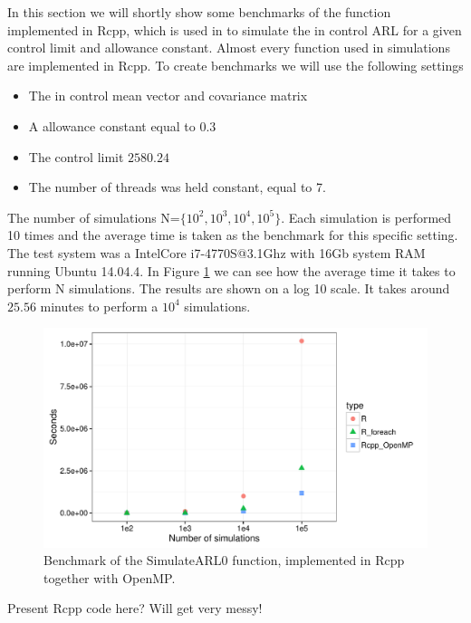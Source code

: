 \documentclass[a4paper,11pt,fleqn,twoside,notitlepage]{report}\usepackage[]{graphicx}\usepackage[]{color}
\makeatletter
\def\maxwidth{ %
  \ifdim\Gin@nat@width>\linewidth
    \linewidth
  \else
    \Gin@nat@width
  \fi
}
\newenvironment{knitrout}{}{} %
\makeatother
\begin{document}
In this section we will shortly show some benchmarks of the  function implemented in Rcpp, which is used in to simulate the in control ARL for a given control limit and allowance constant. Almost every function used in simulations are implemented in Rcpp. To create benchmarks we will use the following settings 
\begin{itemize}
\item The in control mean vector and covariance matrix
\item A allowance constant equal to $0.3$
\item The control limit $2580.24$
\item The number of threads was held constant, equal to 7. 
\end{itemize}
The number of simulations N=$\{10^2,10^3,10^4,10^5\}$. Each simulation is performed 10 times and the average time is taken as the benchmark for this specific setting. The test system was a Intel\textregistered Core i7-4770S@3.1Ghz with 16Gb system RAM running Ubuntu 14.04.4. In Figure \ref{fig:BenchmarkFigure} we can see how the average time it takes to perform N simulations. The results are shown on a log 10 scale. It takes around $25.56$ minutes to perform a $10^4$ simulations.
\begin{knitrout}
\color{fgcolor}\begin{figure}[!ht]
\includegraphics[width=\maxwidth]{figure/BenchmarkFigure-1} \caption[Benchmark of the SimulateARL0 function, implemented in Rcpp together with OpenMP]{Benchmark of the SimulateARL0 function, implemented in Rcpp together with OpenMP. }\label{fig:BenchmarkFigure}
\end{figure}


\end{knitrout}
{\Large Present Rcpp code here? Will get very messy!}


\newpage

\printbibliography
 
\end{document}
